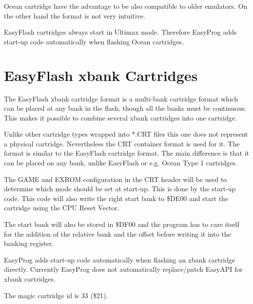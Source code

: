\documentclass[a4paper,oneside]{memoir}
\begin{document}
Ocean cartridge have the advantage to be also compatible to older emulators. On
the other hand the format is not very intuitive.

EasyFlash cartridges always start in Ultimax mode. Therefore EasyProg adds
start-up code automatically when flashing Ocean cartridges.


\chapter{EasyFlash xbank Cartridges}

The EasyFlash xbank cartridge format is a multi-bank cartridge format which can
be placed at any bank in the flash, though all the banks must be continuous.
This makes it possible to combine several xbank cartridges into one cartridge.

Unlike other cartridge types wrapped into *.CRT files this one does not
represent a physical cartridge. Nevertheless the CRT container format is used
for it. The format is similar to the EasyFlash cartridge format. The main
difference is that it can be placed on any bank, unlike EasyFlash or e.g. Ocean
Type 1 cartridges.

The GAME and EXROM configuration in the CRT header will be used to determine
which mode should be set at start-up. This is done by the start-up code. This
code will also write the right start bank to \$DE00 and start the cartridge
using the CPU Reset Vector.

The start bank will also be stored in \$DF00 and the program has to care itself
for the addition of the relative bank and the offset before writing it into the
banking register.

EasyProg adds start-up code automatically when flashing an xbank cartridge
directly. Currently EasyProg does not automatically replace/patch EasyAPI for
xbank cartridges.
 
The magic cartridge id is 33 (\$21).
\end{document}
